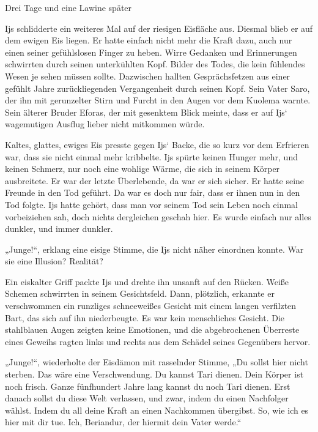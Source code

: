 Drei Tage und eine Lawine später\bigskip



Ijs schlidderte ein weiteres Mal auf der riesigen Eisfläche aus. Diesmal blieb er auf dem ewigen Eis liegen. Er hatte einfach nicht mehr die Kraft dazu, auch nur einen seiner gefühlslosen Finger zu heben. Wirre Gedanken und Erinnerungen schwirrten durch seinen unterkühlten Kopf. Bilder des Todes, die kein fühlendes Wesen je sehen müssen sollte. Dazwischen hallten Gesprächsfetzen aus einer gefühlt Jahre zurückliegenden Vergangenheit durch seinen Kopf. Sein Vater Saro, der ihn mit gerunzelter Stirn und Furcht in den Augen vor dem Kuolema warnte. Sein älterer Bruder Eforas, der mit gesenktem Blick meinte, dass er auf Ijs‘ wagemutigen Ausflug lieber nicht mitkommen würde.

Kaltes, glattes, ewiges Eis presste gegen Ijs‘ Backe, die so kurz vor dem Erfrieren war, dass sie nicht einmal mehr kribbelte. Ijs spürte keinen Hunger mehr, und keinen Schmerz, nur noch eine wohlige Wärme, die sich in seinem Körper ausbreitete. Er war der letzte Überlebende, da war er sich sicher. Er hatte seine Freunde in den Tod geführt. Da war es doch nur fair, dass er ihnen nun in den Tod folgte. Ijs hatte gehört, dass man vor seinem Tod sein Leben noch einmal vorbeiziehen sah, doch nichts dergleichen geschah hier. Es wurde einfach nur alles dunkler, und immer dunkler.

„Junge!“, erklang eine eisige Stimme, die Ijs nicht näher einordnen konnte. War sie eine Illusion? Realität?

Ein eiskalter Griff packte Ijs und drehte ihn unsanft auf den Rücken. Weiße Schemen schwirrten in seinem Gesichtsfeld. Dann, plötzlich, erkannte er verschwommen ein runzliges schneeweißes Gesicht mit einem langen verfilzten Bart, das sich auf ihn niederbeugte. Es war kein menschliches Gesicht. Die stahlblauen Augen zeigten keine Emotionen, und die abgebrochenen Überreste eines Geweihs ragten links und rechts aus dem Schädel seines Gegenübers hervor.

„Junge!“, wiederholte der Eisdämon mit rasselnder Stimme, „Du sollst hier nicht sterben. Das wäre eine Verschwendung. Du kannst Tari dienen. Dein Körper ist noch frisch. Ganze fünfhundert Jahre lang kannst du noch Tari dienen. Erst danach sollst du diese Welt verlassen, und zwar, indem du einen Nachfolger wählst. Indem du all deine Kraft an einen Nachkommen übergibst. So, wie ich es hier mit dir tue. Ich, Beriandur, der hiermit dein Vater werde.“

